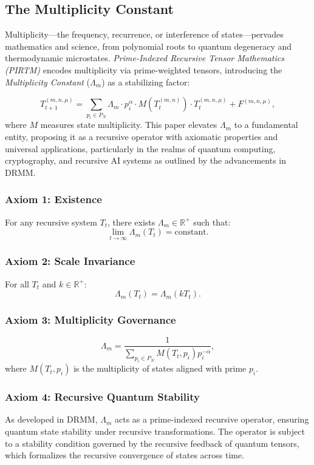 \documentclass[12pt]{article}
\begin{document}
\subsection{ The Multiplicity Constant}

Multiplicity---the frequency, recurrence, or interference of states---pervades mathematics and science, from polynomial roots to quantum degeneracy and thermodynamic microstates. \textit{Prime-Indexed Recursive Tensor Mathematics (PIRTM)} encodes multiplicity via prime-weighted tensors, introducing the \textit{Multiplicity Constant} ($\Lambda_m$) as a stabilizing factor:

\[
T_{t+1}^{(m, n, \mu)} = \sum_{p_i \in P_N} \Lambda_m \cdot p_i^\alpha \cdot M(T_t^{(m, n)}) \cdot T_t^{(m, n, \mu)} + F^{(m, n, \mu)},
\]
where $M$ measures state multiplicity. This paper elevates $\Lambda_m$ to a fundamental entity, proposing it as a recursive operator with axiomatic properties and universal applications, particularly in the realms of quantum computing, cryptography, and recursive AI systems as outlined by the advancements in DRMM.

\subsubsection{Axiom 1: Existence}
For any recursive system $T_t$, there exists $\Lambda_m \in \mathbb{R}^+$ such that:
\[
\lim_{t \to \infty} \Lambda_m(T_t) = \text{constant}.
\]

\subsubsection{Axiom 2: Scale Invariance}
For all $T_t$ and $k \in \mathbb{R}^+$:
\[
\Lambda_m(T_t) = \Lambda_m(k T_t).
\]

\subsubsection{Axiom 3: Multiplicity Governance}
\[
\Lambda_m = \frac{1}{\sum_{p_i \in P_N} M(T_t, p_i) p_i^{-\alpha}},
\]
where $M(T_t, p_i)$ is the multiplicity of states aligned with prime $p_i$.

\subsubsection{Axiom 4: Recursive Quantum Stability}
As developed in DRMM, $\Lambda_m$ acts as a prime-indexed recursive operator, ensuring quantum state stability under recursive transformations. The operator is subject to a stability condition governed by the recursive feedback of quantum tensors, which formalizes the recursive convergence of states across time.
\end{document}
